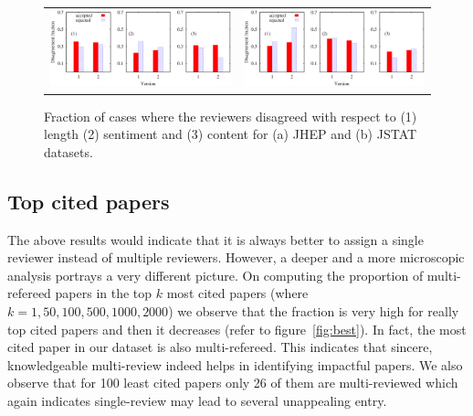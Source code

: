 \begin{figure}
\centering
\begin{tabular}{cc}
\includegraphics[scale = 0.25]{./texfiles/Chapter_4/cikm_17/figures/jhep_all.eps} & \includegraphics[scale = 0.25]{./texfiles/Chapter_4/cikm_17/figures/jstat_all.eps}
\end{tabular}
\caption{\label{disagree:jhep} Fraction of cases where the reviewers disagreed with respect to (1) length (2) sentiment and (3) content for (a) JHEP and (b) JSTAT 
  datasets.}
\end{figure}  

\subsection{Top cited papers}

The above results would indicate that it is always better to assign a single reviewer instead of multiple reviewers. However, 
a deeper and a more microscopic analysis portrays a very different picture. 
On  computing the proportion of multi-refereed papers in the top $k$ most cited papers (where $k = 1,50,100,500,1000,2000$) we observe that the 
fraction is very high for really top cited papers and then it decreases (refer to figure~\ref{fig:best}).
In fact, the most cited paper in our dataset is also multi-refereed.  
This indicates that sincere, knowledgeable multi-review indeed helps in identifying impactful papers. 
We also observe that for 100 least cited papers only 26 of them are 
multi-reviewed which again indicates single-review may lead to several unappealing entry. 

